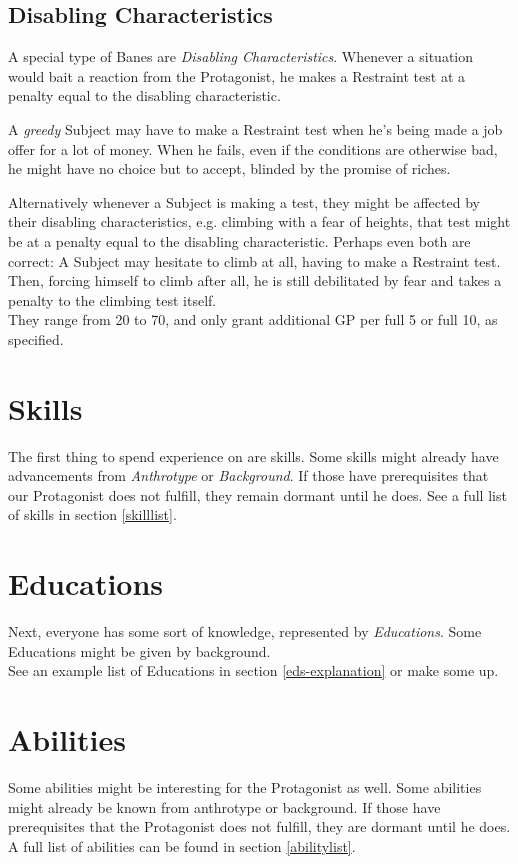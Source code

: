 \documentclass[11pt,a4paper,openany,dvipsnames]{book}
\begin{document}
	\subsection{Disabling Characteristics}
	A special type of Banes are \emph{Disabling Characteristics}.
	Whenever a situation would bait a reaction from the Protagonist,
		he makes a Restraint test at a penalty equal to the disabling characteristic.
		\begin{exampleblock}
			A \emph{greedy} Subject may have to make a Restraint test
				when he's being made a job offer for a lot of money.
			When he fails, even if the conditions are otherwise bad,
				he might have no choice but to accept,
				blinded by the promise of riches.
		\end{exampleblock}
	Alternatively whenever a Subject is making a test, they might be affected by their disabling characteristics,
	e.g. climbing with a fear of heights, that test might be at a penalty equal to the disabling characteristic.
	Perhaps even both are correct:
	A Subject may hesitate to climb at all, having to make a Restraint test.
	Then, forcing himself to climb after all,
		he is still debilitated by fear and takes a penalty to the climbing test itself.
	\\%
	They range from 20 to 70, and only grant additional GP per full 5 or full 10, as specified.

	\section{Skills}
	The first thing to spend experience on are skills.
	Some skills might already have advancements from \emph{Anthrotype} or \emph{Background}.
	If those have prerequisites that our Protagonist does not fulfill,
		they remain dormant until he does.
	See a full list of skills in section \ref{skilllist}.
	\section{Educations}
	Next, everyone has some sort of knowledge, represented by \emph{Educations}.
	Some Educations might be given by background.
	\\%
	See an example list of Educations in section \ref{eds-explanation} or make some up.
	\section{Abilities}
	Some abilities might be interesting for the Protagonist as well.
	Some abilities might already be known from anthrotype or background.
	If those have prerequisites that the Protagonist does not fulfill,
		they are dormant until he does.
	A full list of abilities can be found in section \ref{abilitylist}.
\end{document}

